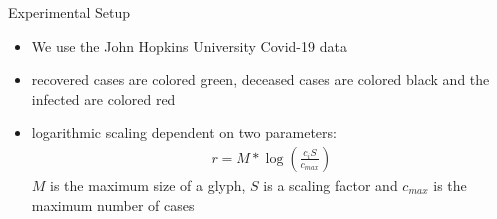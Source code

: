 \documentclass{beamer}
\begin{document}
  \begin{frame}{Experimental Setup}
	\begin{itemize}
		\item We use the John Hopkins University Covid-19 data
		\item recovered cases are colored green, deceased cases are colored black and 		the infected are colored red
		\item logarithmic scaling dependent on two parameters:
		\begin{align*}
			r=M* \log \left( \frac{c_i S}{c_{max}} \right)
		\end{align*}
		$M$ is the maximum size of a glyph, $S$ is a scaling factor and $c_{max}$ is 			the maximum number of cases
	\end{itemize}
\end{frame}
  
  
  
\end{document}

